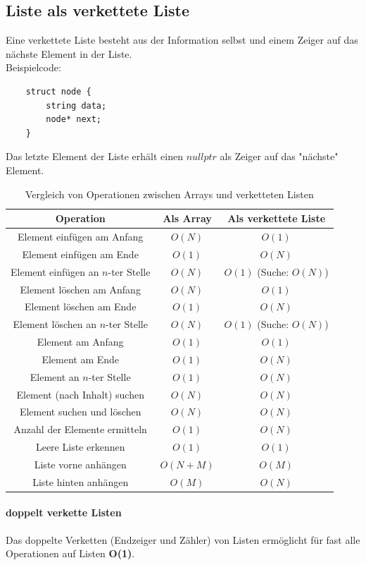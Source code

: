 \documentclass{book}
\begin{document}
\subsection{Liste als verkettete Liste}
Eine verkettete Liste besteht aus der Information selbst und einem Zeiger auf das nächste Element in der Liste.\\
Beispielcode: 
\begin{Verbatim}
	struct node {
		string data;
		node* next;
	}
\end{Verbatim}
Das letzte Element der Liste erhält einen $nullptr$ als Zeiger auf das "nächste" Element.
\begin{table}[htbp]
	\centering
	\begin{tabular}{|c|c|c|}
	\hline
	Operation & Als Array & Als verkettete Liste \\
	\hline
	Element einfügen am Anfang & $O(N)$ & $O(1)$ \\
	Element einfügen am Ende & $O(1)$ & $O(N)$ \\
	Element einfügen an $n$-ter Stelle & $O(N)$ & $O(1)$ (Suche: $O(N)$) \\
	Element löschen am Anfang & $O(N)$ & $O(1)$ \\
	Element löschen am Ende & $O(1)$ & $O(N)$ \\
	Element löschen an $n$-ter Stelle & $O(N)$ & $O(1)$ (Suche: $O(N)$) \\
	Element am Anfang & $O(1)$ & $O(1)$ \\
	Element am Ende & $O(1)$ & $O(N)$ \\
	Element an $n$-ter Stelle & $O(1)$ & $O(N)$ \\
	Element (nach Inhalt) suchen & $O(N)$ & $O(N)$ \\
	Element suchen und löschen & $O(N)$ & $O(N)$ \\
	Anzahl der Elemente ermitteln & $O(1)$ & $O(N)$ \\
	Leere Liste erkennen & $O(1)$ & $O(1)$ \\
	Liste vorne anhängen & $O(N+M)$ & $O(M)$ \\
	Liste hinten anhängen & $O(M)$ & $O(N)$ \\
	\hline
	\end{tabular}
	\caption{Vergleich von Operationen zwischen Arrays und verketteten Listen}
	\label{tab:operationen-vergleich}
	\end{table}

\paragraph{doppelt verkette Listen} Das doppelte Verketten (Endzeiger und Zähler) von Listen ermöglicht für fast alle Operationen auf Listen \textbf{O(1)}.
\end{document}
